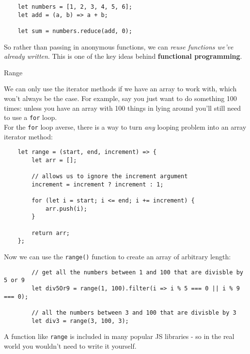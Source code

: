 \begin{verbatim}
    let numbers = [1, 2, 3, 4, 5, 6];
    let add = (a, b) => a + b;

    let sum = numbers.reduce(add, 0);
\end{verbatim}

So rather than passing in anonymous functions, we can \textit{reuse functions we've already written}. This is one of the key ideas behind \textbf{functional programming}.


\pagebreak

\begin{infobox}{Range}

    We can only use the iterator methods if we have an array to work with, which won't always be the case. For example, say you just want to do something 100 times: unless you have an array with 100 things in lying around you'll still need to use a \texttt{for} loop.
    \\

    For the \texttt{for} loop averse, there is a way to turn \textit{any} looping problem into an array iterator method:

    \begin{verbatim}
    let range = (start, end, increment) => {
        let arr = [];

        // allows us to ignore the increment argument
        increment = increment ? increment : 1;

        for (let i = start; i <= end; i += increment) {
            arr.push(i);
        }

        return arr;
    };
    \end{verbatim}

    Now we can use the \texttt{range()} function to create an array of arbitrary length:

    \begin{verbatim}
        // get all the numbers between 1 and 100 that are divisble by 5 or 9
        let div5Or9 = range(1, 100).filter(i => i % 5 === 0 || i % 9 === 0);

        // all the numbers between 3 and 100 that are divisble by 3
        let div3 = range(3, 100, 3);
    \end{verbatim}

    A function like \texttt{range} is included in many popular JS libraries - so in the real world you wouldn't need to write it yourself.
\end{infobox}

